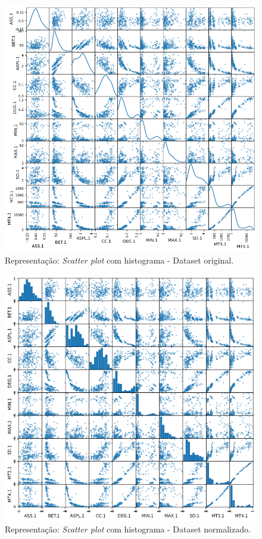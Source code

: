 \documentclass[
	article,			%
	11pt,				%
	oneside,			%
	a4paper,			%
	english,			%
	brazil,				%
	sumario=tradicional
	]{abntex2}
\begin{document}
\newpage
\begin{figure}[H]
 \centering
 \includegraphics[scale=0.5]{fig/scatter_kde01.png}
 \caption{Representação: \textit{Scatter plot} com histograma - Dataset original.}
 \label{fig:scatter_kde01}
\end{figure}

\newpage
\begin{figure}[H]
 \centering
 \includegraphics[scale=0.5]{fig/scatter_hist02.png}
 \caption{Representação: \textit{Scatter plot} com histograma - Dataset normalizado.}
 \label{fig:scatter_hist02}
\end{figure}
\end{document}
